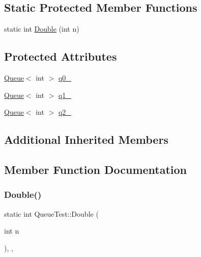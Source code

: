 \subsection*{Static Protected Member Functions}
\begin{DoxyCompactItemize}
\item 
static int \hyperlink{class_queue_test_a2c7e0d1edb558dbbc4c085316d3d1ee6}{Double} (int n)
\end{DoxyCompactItemize}
\subsection*{Protected Attributes}
\begin{DoxyCompactItemize}
\item 
\hyperlink{class_queue}{Queue}$<$ int $>$ \hyperlink{class_queue_test_a0eba1fe2b31d75abd2df688ca5245e22}{q0\+\_\+}
\item 
\hyperlink{class_queue}{Queue}$<$ int $>$ \hyperlink{class_queue_test_a1e55594e71820ba0f1b09591fb328c30}{q1\+\_\+}
\item 
\hyperlink{class_queue}{Queue}$<$ int $>$ \hyperlink{class_queue_test_aeb7a2e3f6ce2d97d84eb1e01468adc2f}{q2\+\_\+}
\end{DoxyCompactItemize}
\subsection*{Additional Inherited Members}


\subsection{Member Function Documentation}
\mbox{\label{class_queue_test_a2c7e0d1edb558dbbc4c085316d3d1ee6}} 
\subsubsection{\texorpdfstring{Double()}{Double()}}
{\footnotesize\ttfamily static int Queue\+Test\+::\+Double (\begin{DoxyParamCaption}\item[{int}]{n }\end{DoxyParamCaption})\hspace{0.3cm}{\ttfamily [inline]}, {\ttfamily [static]}, {\ttfamily [protected]}}

\mbox{\label{class_queue_test_a7f1661cd16c428a130d6ac1e4246eaab}} 
